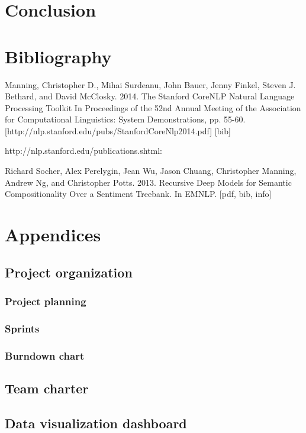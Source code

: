 \documentclass[11pt]{article}
\begin{document}

\section{Conclusion}


\section{Bibliography}




Manning, Christopher D., Mihai Surdeanu, John Bauer, Jenny Finkel, Steven J. Bethard, and David McClosky. 2014. The Stanford CoreNLP Natural Language Processing Toolkit In Proceedings of the 52nd Annual Meeting of the Association for Computational Linguistics: System Demonstrations, pp. 55-60. [http://nlp.stanford.edu/pubs/StanfordCoreNlp2014.pdf] [bib]

http://nlp.stanford.edu/publications.shtml:

Richard Socher, Alex Perelygin, Jean Wu, Jason Chuang, Christopher Manning, Andrew Ng, and Christopher Potts. 2013. Recursive Deep Models for Semantic Compositionality Over a Sentiment Treebank. In EMNLP. [pdf, bib, info]

\section{Appendices}
\subsection{Project organization}

\subsubsection{Project planning}

\subsubsection{Sprints}

\subsubsection{Burndown chart}


\subsection{Team charter}

\subsection{Data visualization dashboard}
\end{document}
